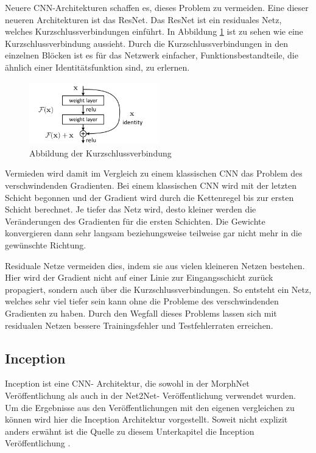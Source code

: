 Neuere CNN-Architekturen schaffen es, dieses Problem zu vermeiden. Eine dieser neueren Architekturen ist das ResNet. Das ResNet ist ein residuales Netz, welches Kurzschlussverbindungen einführt. In Abbildung \ref{abb:residual} ist zu sehen wie eine Kurzschlussverbindung aussieht. Durch die Kurzschlussverbindungen in den einzelnen Blöcken ist es für das Netzwerk einfacher, Funktionsbestandteile, die ähnlich einer Identitätsfunktion sind, zu erlernen.   

\begin{figure}[h]
 \centering
 \includegraphics[width=0.5\textwidth]{KapitelPartA/images/kurzschluss.png}
 \caption{Abbildung der Kurzschlussverbindung \cite{resnet}}
 \label{abb:residual}
\end{figure}



Vermieden wird damit im Vergleich zu einem klassischen CNN das Problem des verschwindenden Gradienten. Bei einem klassischen CNN wird mit der letzten Schicht begonnen und der Gradient wird durch die Kettenregel bis zur ersten Schicht berechnet. Je tiefer das Netz wird, desto kleiner werden die Veränderungen des Gradienten für die ersten Schichten. Die Gewichte konvergieren dann sehr langsam beziehungsweise teilweise gar nicht mehr in die gewünschte Richtung.


Residuale Netze vermeiden dies, indem sie aus vielen kleineren Netzen bestehen. Hier wird der Gradient nicht auf einer Linie zur Eingangsschicht zurück propagiert, sondern auch über die Kurzschlussverbindungen. So entsteht ein Netz, welches sehr viel tiefer sein kann ohne die Probleme des verschwindenden Gradienten zu haben. Durch den Wegfall dieses Problems lassen sich mit residualen Netzen bessere Trainingsfehler und Testfehlerraten erreichen.



\subsection{Inception}\label{sec:inception}
Inception ist eine CNN- Architektur, die sowohl in der MorphNet Veröffentlichung als auch in der Net2Net- Veröffentlichung verwendet wurden. Um die Ergebnisse aus den Veröffentlichungen mit den eigenen vergleichen zu können wird hier die Inception Architektur vorgestellt. Soweit nicht explizit anders erwähnt ist die Quelle zu diesem Unterkapitel die Inception Veröffentlichung \cite{inception}.


